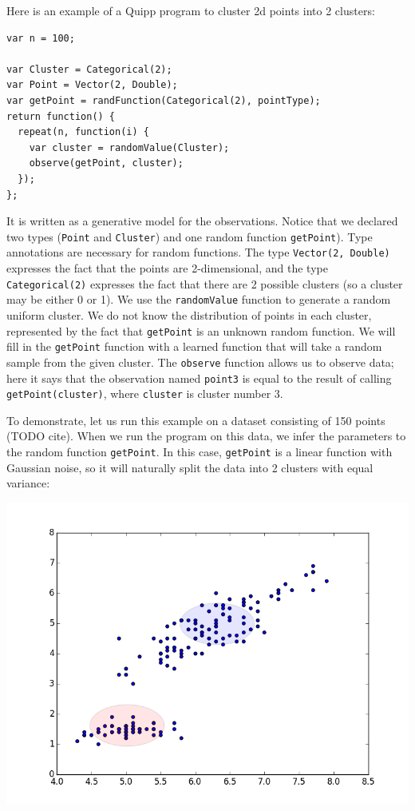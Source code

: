 \documentclass{article}
\begin{document}
  Here is an example of a Quipp program to cluster 2d points into 2 clusters:
  \begin{verbatim}
var n = 100;

var Cluster = Categorical(2);
var Point = Vector(2, Double);
var getPoint = randFunction(Categorical(2), pointType);
return function() {
  repeat(n, function(i) {
    var cluster = randomValue(Cluster);
    observe(getPoint, cluster);
  });
};
  \end{verbatim}

  It is written as a generative model for the observations.  Notice that
  we declared two types (\texttt{Point} and \texttt{Cluster}) and one
  random function \texttt{getPoint}).  Type annotations are necessary for random
  functions.  The type \texttt{Vector(2, Double)} expresses the fact that the
  points are 2-dimensional, and the type \texttt{Categorical(2)} expresses the
  fact that there are 2 possible clusters (so a cluster may be either 0 or 1).
  We use the \texttt{randomValue} function to generate a random uniform cluster. We do not know
  the distribution of points in each cluster, represented by the fact that \texttt{getPoint}
  is an unknown random function.  We will fill in the
  \texttt{getPoint} function with a learned function that will take a random
  sample from the given cluster.  The \texttt{observe} function allows us to
  observe data; here it says that the observation named \texttt{point3} is equal
  to the result of calling \texttt{getPoint(cluster)}, where \texttt{cluster} is
  cluster number 3.


  To demonstrate, let us run this example on a dataset consisting of 150 points (TODO cite).  When we run the program on this data, we infer the parameters to the random function \texttt{getPoint}.
  In this case, \texttt{getPoint} is a linear function with Gaussian noise, so it will naturally
  split the data into 2 clusters with equal variance:
  \begin{center}
    \includegraphics[scale=0.5]{../plots/irisclusters_orig.png}
  \end{center}
\end{document}
